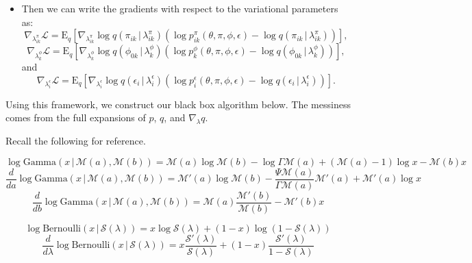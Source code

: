 \documentclass{article}
\newcommand{\E}{\mathrm{E}}
\newcommand{\g}{\, | \,}
\begin{document}
\begin{itemize}
\item Then we can write the gradients with respect to the variational parameters as: \[\nabla_{\lambda^\pi_{ik}} \mathcal{L} = \E_q \left[ \nabla_{\lambda^\pi_{ik}} \log q(\pi_{ik} \g \lambda^\pi_{ik}) \left( \log p^\pi_{ik}(\theta, \pi, \phi, \epsilon) - \log q(\pi_{ik} \g \lambda^\pi_{ik}) \right)\right],\]
\[\nabla_{\lambda^\phi_{k}} \mathcal{L} = \E_q \left[ \nabla_{\lambda^\phi_{k}} \log q(\phi_{0k} \g \lambda^\phi_{k}) \left( \log p^\phi_{k}(\theta, \pi, \phi, \epsilon) - \log q(\phi_{0k} \g \lambda^\phi_{k}) \right)\right],\]
and
\[\nabla_{\lambda^\epsilon_{i}} \mathcal{L} = \E_q \left[ \nabla_{\lambda^\epsilon_{i}} \log q(\epsilon_{i} \g \lambda^\epsilon_{i}) \left( \log p^\epsilon_{i}(\theta, \pi, \phi, \epsilon) - \log q(\epsilon_{i} \g \lambda^\epsilon_{i}) \right)\right].\]
\end{itemize}

Using this framework, we construct our black box algorithm below.  The messiness comes from the full expansions of $p$, $q$, and $\nabla_\lambda q$.

Recall the following for reference.

\[\log\mbox{Gamma}(x \g \mathcal{M}(a), \mathcal{M}(b)) = 
\mathcal{M}(a)\log \mathcal{M}(b) - \log\Gamma \mathcal{M}(a) +(\mathcal{M}(a)-1)\log x -\mathcal{M}(b)x
\]
\[\frac{d}{d a}\log\mbox{Gamma}(x \g \mathcal{M}(a), \mathcal{M}(b)) = 
\mathcal{M}'(a)\log \mathcal{M}(b) - \frac{\Psi \mathcal{M}(a)}{\Gamma \mathcal{M}(a)}\mathcal{M}'(a) + \mathcal{M}'(a)\log x
\]
\[\frac{d}{d b}\log\mbox{Gamma}(x \g \mathcal{M}(a), \mathcal{M}(b)) = 
\mathcal{M}(a)\frac{\mathcal{M}'(b)}{\mathcal{M}(b)} -\mathcal{M}'(b)x
\]

\[\log\mbox{Bernoulli}(x \g \mathcal{S}(\lambda)) = 
x\log \mathcal{S}(\lambda) +(1-x)\log(1-\mathcal{S}(\lambda))
\]
\[\frac{d}{d \lambda}\log\mbox{Bernoulli}(x \g \mathcal{S}(\lambda)) = 
x\frac{\mathcal{S}'(\lambda)}{\mathcal{S}(\lambda)} + (1-x)\frac{\mathcal{S}'(\lambda)}{1-\mathcal{S}(\lambda)}
\]
\end{document}
